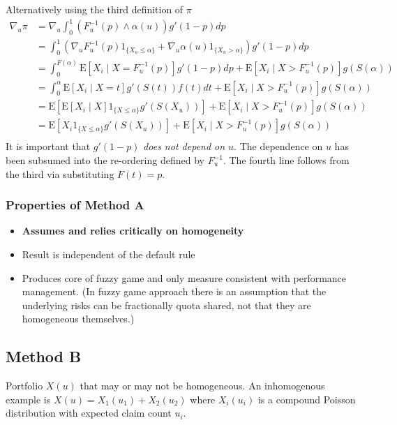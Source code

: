 Alternatively using the third definition of \(\pi\) \[
\begin{align}
\nabla_u\pi
&= \nabla_u \int_0^1 (F_u^{-1}(p)\wedge \alpha(u)) g'(1-p)dp  \\
&= \int_0^1 \left(\nabla_u F_u^{-1}(p) 1_{\{X_u\le \alpha\}} +
            \nabla_u \alpha(u) 1_{\{X_u > \alpha\}}\right) g'(1-p)dp  \\
&= \int_0^{F(\alpha)} \text{E}[X_i \mid X=F_u^{-1}(p) ] g'(1-p)dp + \text{E}[X_i \mid X> F_u^{-1}(p)] g(S(\alpha)) \\
&= \int_0^{\alpha} \text{E}[X_i \mid X=t ] g'(S(t))f(t)dt + \text{E}[X_i \mid X> F_u^{-1}(p)] g(S(\alpha)) \\
&= \text{E}\left[ \text{E}[X_i \mid X ]1_{\{X\le\alpha\}} g'(S(X_u)) \right]
+ \text{E}[X_i \mid X> F_u^{-1}(p)] g(S(\alpha)) \\
&= \text{E}\left[ X_i 1_{\{X\le\alpha\}} g'(S(X_u)) \right]
+ \text{E}[X_i \mid X> F_u^{-1}(p)] g(S(\alpha)) \\
\end{align}
\] It is important that \(g'(1-p)\) \emph{does not depend on \(u\)}. The
dependence on \(u\) has been subsumed into the re-ordering defined by
\(F_u^{-1}\). The fourth line follows from the third via substituting
\(F(t)=p\).

\hypertarget{properties-of-method-a}{%
\subsubsection{Properties of Method A}\label{properties-of-method-a}}

\begin{itemize}
\tightlist
\item
  \textbf{Assumes and relies critically on homogeneity}
\item
  Result is independent of the default rule
\item
  Produces core of fuzzy game and only measure consistent with
  performance management. (In fuzzy game approach there is an assumption
  that the underlying risks can be fractionally quota shared, not that
  they are homogeneous themselves.)
\end{itemize}

\hypertarget{method-b}{%
\subsection{Method B}\label{method-b}}

Portfolio \(X(u)\) that may or may not be homogeneous. An inhomogenous
example is \(X(u)=X_1(u_1) + X_2(u_2)\) where \(X_i(u_i)\) is a compound
Poisson distribution with expected claim count \(u_i\).


